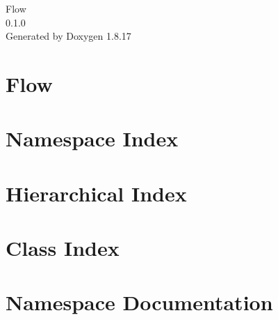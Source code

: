\let\mypdfximage\pdfximage\def\pdfximage{\immediate\mypdfximage}\documentclass[twoside]{book}
\newcommand{\+}{\discretionary{\mbox{\scriptsize$\hookleftarrow$}}{}{}}
\newcommand{\clearemptydoublepage}{%
  \newpage{\pagestyle{empty}\cleardoublepage}%
}
\begin{document}
\hypersetup{pageanchor=false,
             bookmarksnumbered=true,
             pdfencoding=unicode
            }
\begin{titlepage}
\vspace*{7cm}
\begin{center}%
{\Large Flow \\[1ex]\large 0.\+1.\+0 }\\
\vspace*{1cm}
{\large Generated by Doxygen 1.8.17}\\
\end{center}
\end{titlepage}
\clearemptydoublepage
{}
\tableofcontents
\clearemptydoublepage
{}
\hypersetup{pageanchor=true}

\chapter{Flow}
\label{index}\hypertarget{index}{}
\chapter{Namespace Index}

\chapter{Hierarchical Index}

\chapter{Class Index}

\chapter{Namespace Documentation}



\end{document}
